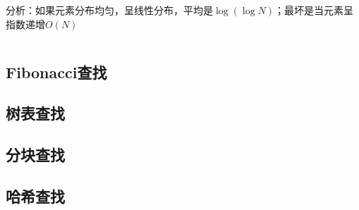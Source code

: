 \documentclass{article}
\begin{document}
      分析：如果元素分布均匀，呈线性分布，平均是$\log{(\log N)}$；最坏是当元素呈指数递增$O(N)$

      \inputminted{java}{src/chapter03/LinearInterpolationSearch.java}
    \subsection{Fibonacci查找}
    \subsection{树表查找}
    \subsection{分块查找}
    \subsection{哈希查找}
\end{document}
